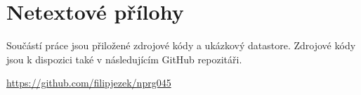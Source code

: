 \chapter{Netextové přílohy}
\label{app:appendices}

Součástí práce jsou přiložené zdrojové kódy a ukázkový datastore. Zdrojové kódy jsou k dispozici také v následujícím GitHub repozitáři.

\begin{center}
  \url{https://github.com/filipjezek/nprg045}
\end{center}